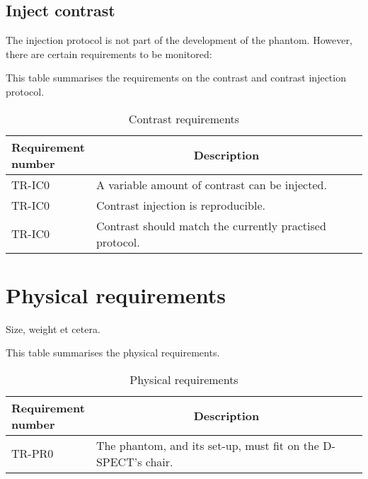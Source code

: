 \subsection{Inject contrast}
The injection protocol is not part of the development of the phantom. However, there are certain requirements to be monitored:
\begin{table} [H]
\caption{Contrast requirements}
\label{tab:injcon}
This table summarises the requirements on the contrast and contrast injection protocol.
\begin{tabular}{l|p{120mm}|}
	\makecell[l]{\textbf{Requirement} \\ \textbf{number}} & \multicolumn{1}{c}{\textbf{Description}}\\
	\hline
	TR-IC0 & A variable amount of contrast can be injected. \\
	TR-IC0 & Contrast injection is reproducible. \\
	TR-IC0 & Contrast should match the currently practised protocol.  \\
	\cline{2-2}
\end{tabular}
\end{table}

\section{Physical requirements}
Size, weight et cetera.
\begin{table} [H]
\caption{Physical requirements}
\label{tab:physrec}
This table summarises the physical requirements.
\begin{tabular}{l|p{120mm}|}
	\makecell[l]{\textbf{Requirement} \\ \textbf{number}} & \multicolumn{1}{c}{\textbf{Description}}\\
	\hline
	TR-PR0 & The phantom, and its set-up, must fit on the D-SPECT's chair. \\ 
	\cline{2-2}
\end{tabular}
\end{table}

